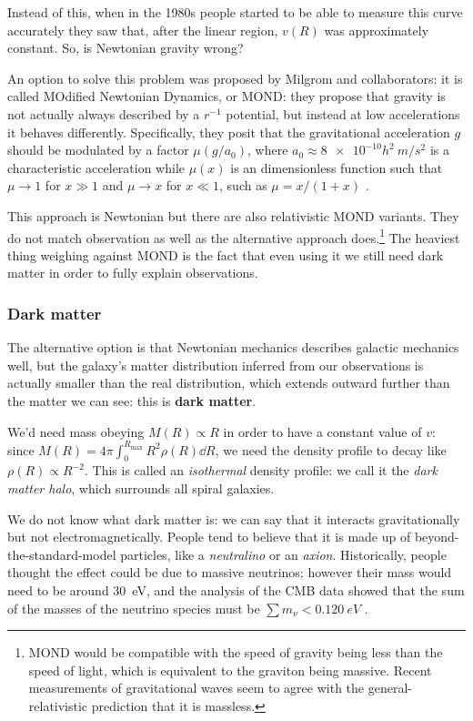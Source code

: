 \documentclass[main.tex]{subfiles}
\begin{document}
Instead of this, when in the 1980s people started to be able to measure this curve accurately they saw that, after the linear region, \(v(R)\) was approximately constant.
So, is Newtonian gravity wrong?

An option to solve this problem was proposed by Milgrom and collaborators: it is called MOdified Newtonian Dynamics, or MOND: they propose that gravity is not actually always described by a \(r^{-1}\) potential, but instead at low accelerations it behaves differently.
Specifically, they posit that the gravitational acceleration \(g\) should be modulated by a factor \(\mu (g / a_0 )\), where \(a_0 \approx \num{8e-10} h^2 \SI{}{m /s^2}\) is a characteristic acceleration while \(\mu (x)\) is an dimensionless function such that \(\mu \rightarrow 1\) for \(x \gg 1\) and \(\mu \rightarrow x\) for \(x \ll 1\), such as \(\mu = x / (1+x)\) \cite{bekensteinDoesMissingMass1984}.

This approach is Newtonian but there are also relativistic MOND variants. They do not match observation as well as the alternative approach does.\footnote{MOND would be compatible with the speed of gravity being less than the speed of light, which is equivalent to the graviton being massive. Recent measurements of gravitational waves seem to agree with the general-relativistic prediction that it is massless.}
The heaviest thing weighing against MOND is the fact that even using it we still need dark matter in order to fully explain observations.

\subsubsection{Dark matter}

The alternative option is that Newtonian mechanics describes galactic mechanics well, but the galaxy's matter distribution inferred from our observations is actually smaller than the real distribution, which extends outward further than the matter we can see: this is \textbf{dark matter}.

We'd need mass obeying \(M (R) \propto R\) in order to have a constant value of \(v\): since \(M(R) = 4 \pi \int_0^{R_{\text{max}}}  R^2 \rho(R) \dd{R}\), we need the density profile to decay like \(\rho(R) \propto R^{-2}\).
This is called an \emph{isothermal} density profile: we call it the \emph{dark matter halo}, which surrounds all spiral galaxies.

We do not know what dark matter is: we can say that it   interacts gravitationally but not electromagnetically.
People tend to believe that it is made up of beyond-the-standard-model particles, like a \emph{neutralino} or an \emph{axion}.
Historically, people thought the effect could be due to massive neutrinos; however their mass would need to be around \SI{30}{eV}, and the analysis of the CMB data showed that the sum of the masses of the neutrino species must be \(\sum m_\nu < \SI{0.120}{eV}\) \cite[Table 7]{planckcollaborationPlanck2018Results2019a}.
\end{document}
